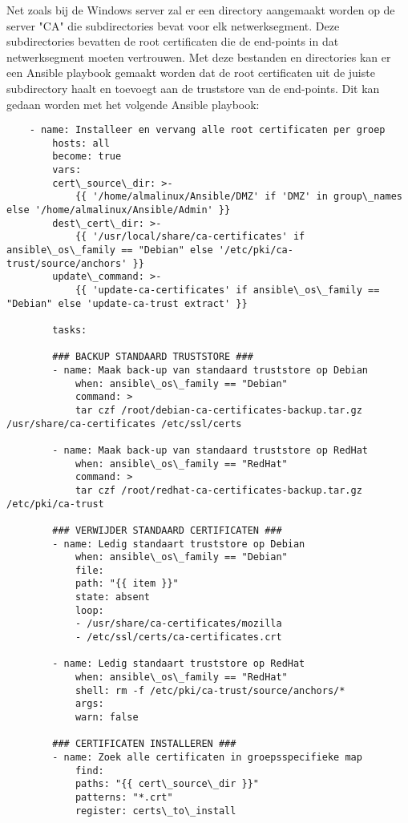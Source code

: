 Net zoals bij de Windows server zal er een directory aangemaakt worden op de server "CA" die subdirectories bevat voor elk netwerksegment. Deze subdirectories bevatten de root certificaten die de end-points in dat netwerksegment moeten vertrouwen.
Met deze bestanden en directories kan er een Ansible playbook gemaakt worden dat de root certificaten uit de juiste subdirectory haalt en toevoegt aan de truststore van de end-points. Dit kan gedaan worden met het volgende Ansible playbook:
\begin{verbatim}
    - name: Installeer en vervang alle root certificaten per groep
        hosts: all
        become: true
        vars:
        cert\_source\_dir: >-
            {{ '/home/almalinux/Ansible/DMZ' if 'DMZ' in group\_names else '/home/almalinux/Ansible/Admin' }}
        dest\_cert\_dir: >-
            {{ '/usr/local/share/ca-certificates' if ansible\_os\_family == "Debian" else '/etc/pki/ca-trust/source/anchors' }}
        update\_command: >-
            {{ 'update-ca-certificates' if ansible\_os\_family == "Debian" else 'update-ca-trust extract' }}
    
        tasks:
    
        ### BACKUP STANDAARD TRUSTSTORE ###
        - name: Maak back-up van standaard truststore op Debian
            when: ansible\_os\_family == "Debian"
            command: >
            tar czf /root/debian-ca-certificates-backup.tar.gz /usr/share/ca-certificates /etc/ssl/certs
    
        - name: Maak back-up van standaard truststore op RedHat
            when: ansible\_os\_family == "RedHat"
            command: >
            tar czf /root/redhat-ca-certificates-backup.tar.gz /etc/pki/ca-trust
    
        ### VERWIJDER STANDAARD CERTIFICATEN ###
        - name: Ledig standaart truststore op Debian
            when: ansible\_os\_family == "Debian"
            file:
            path: "{{ item }}"
            state: absent
            loop:
            - /usr/share/ca-certificates/mozilla
            - /etc/ssl/certs/ca-certificates.crt
    
        - name: Ledig standaart truststore op RedHat
            when: ansible\_os\_family == "RedHat"
            shell: rm -f /etc/pki/ca-trust/source/anchors/*
            args:
            warn: false
    
        ### CERTIFICATEN INSTALLEREN ###
        - name: Zoek alle certificaten in groepsspecifieke map
            find:
            paths: "{{ cert\_source\_dir }}"
            patterns: "*.crt"
            register: certs\_to\_install
    

\end{verbatim}

